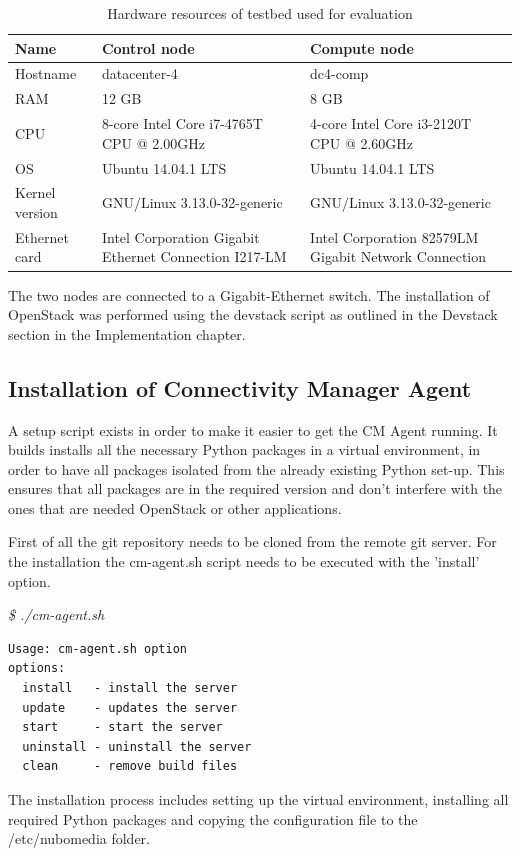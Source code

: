 \begin{table}[H]
\centering

\begin{tabularx}{\textwidth}{ |X|X|X| }
\hline Name & \textbf{Control node} & \textbf{Compute node} \\ 
\hline Hostname & datacenter-4 & dc4-comp \\ 
\hline RAM & 12 GB & 8 GB \\ 
\hline CPU & 8-core Intel Core i7-4765T CPU @ 2.00GHz & 4-core Intel Core i3-2120T CPU @ 2.60GHz \\ 
\hline OS & Ubuntu 14.04.1 LTS & Ubuntu 14.04.1 LTS \\ 
\hline Kernel version & GNU/Linux 3.13.0-32-generic & GNU/Linux 3.13.0-32-generic \\
\hline Ethernet card & Intel Corporation Gigabit Ethernet Connection I217-LM & Intel Corporation 82579LM Gigabit Network Connection \\ 
\hline 
\end{tabularx}

\caption{Hardware resources of testbed used for evaluation}
\end{table}


The two nodes are connected to a Gigabit-Ethernet switch. The installation of OpenStack was performed using the devstack script as outlined in the Devstack section in the Implementation chapter.

\subsection{Installation of Connectivity Manager Agent}

A setup script exists in order to make it easier to get the CM Agent running. It builds installs all the necessary Python packages in a virtual environment, in order to have all packages isolated from the already existing Python set-up. This ensures that all packages are in the required version and don't interfere with the ones that are needed OpenStack or other applications. 

First of all the git repository needs to be cloned from the remote git server. For the installation the cm-agent.sh script needs to be executed with the 'install' option.

\textit{\$ ./cm-agent.sh}
\begin{lstlisting}
Usage: cm-agent.sh option
options:
  install   - install the server
  update    - updates the server
  start     - start the server
  uninstall - uninstall the server
  clean     - remove build files
\end{lstlisting}
The installation process includes setting up the virtual environment, installing all required Python packages and copying the configuration file to the /etc/nubomedia folder.

